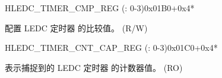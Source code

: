 \begin{register}{H}{LEDC\_TIMER\_CMP\_REG (: 0-3)}{0x01B0+0x4*}\label{regdesc:LEDCTIMERXCMPREG}
%
%
\regnewline%
\begin{regdesc}\begin{reglist}
\label{fielddesc:LEDCTIMERXCMP}\item [LEDC\_TIMER\regindex{x}\_CMP] 配置 LEDC 定时器  的比较值。 (R/W)
\end{reglist}\end{regdesc}
\end{register}


\begin{register}{H}{LEDC\_TIMER\_CNT\_CAP\_REG (: 0-3)}{0x01C0+0x4*}\label{regdesc:LEDCTIMERXCNTCAPREG}
%
%
\regnewline%
\begin{regdesc}\begin{reglist}
\label{fielddesc:LEDCTIMERXCNTCAP}\item [LEDC\_TIMER\regindex{x}\_CNT\_CAP] 表示捕捉到的 LEDC 定时器  的计数器值。 (RO)
\end{reglist}\end{regdesc}
\end{register}


